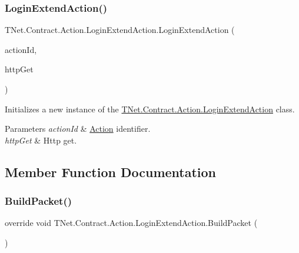 \subsubsection{\texorpdfstring{Login\+Extend\+Action()}{LoginExtendAction()}}
{\footnotesize\ttfamily T\+Net.\+Contract.\+Action.\+Login\+Extend\+Action.\+Login\+Extend\+Action (\begin{DoxyParamCaption}\item[{short}]{action\+Id,  }\item[{\mbox{\hyperlink{class_t_net_1_1_service_1_1_action_getter}{Action\+Getter}}}]{http\+Get }\end{DoxyParamCaption})\hspace{0.3cm}{\ttfamily [protected]}}



Initializes a new instance of the \mbox{\hyperlink{class_t_net_1_1_contract_1_1_action_1_1_login_extend_action}{T\+Net.\+Contract.\+Action.\+Login\+Extend\+Action}} class. 


\begin{DoxyParams}{Parameters}
{\em action\+Id} & \mbox{\hyperlink{namespace_t_net_1_1_contract_1_1_action}{Action}} identifier.\\
\hline
{\em http\+Get} & Http get.\\
\hline
\end{DoxyParams}


\subsection{Member Function Documentation}
\mbox{\label{class_t_net_1_1_contract_1_1_action_1_1_login_extend_action_a44cd85d17ec24e8fa99317d243bb2aa2}} 
\subsubsection{\texorpdfstring{Build\+Packet()}{BuildPacket()}}
{\footnotesize\ttfamily override void T\+Net.\+Contract.\+Action.\+Login\+Extend\+Action.\+Build\+Packet (\begin{DoxyParamCaption}{ }\end{DoxyParamCaption})\hspace{0.3cm}{\ttfamily [virtual]}}



